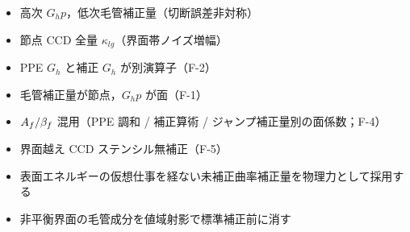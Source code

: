 \begin{tcolorbox}[warnbox,title={避けるべき BF 構成}]
\begin{itemize}[leftmargin=1.5em,noitemsep]
  \item 高次 $G_h p$，低次毛管補正量（切断誤差非対称）
  \item 節点 CCD 全量 $\kappa_{lg}$（界面帯ノイズ増幅）
  \item PPE $G_h$ と補正 $G_h$ が別演算子（F-2）
  \item 毛管補正量が節点，$G_h p$ が面（F-1）
  \item $A_f/\beta_{f}$ 混用（PPE 調和 / 補正算術 / ジャンプ補正量別の面係数；F-4）
  \item 界面越え CCD ステンシル無補正（F-5）
  \item 表面エネルギーの仮想仕事を経ない未補正曲率補正量を物理力として採用する
  \item 非平衡界面の毛管成分を値域射影で標準補正前に消す
\end{itemize}
\end{tcolorbox}

